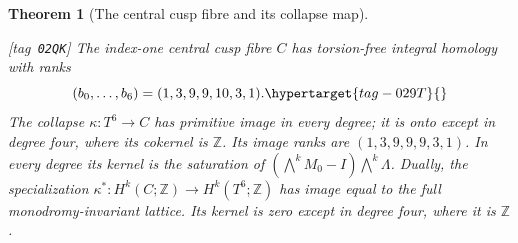 \documentclass[11pt,a4paper]{article}
\numberwithin{equation}{section}
\newtheorem{theorem}{Theorem}[section]
\theoremstyle{definition}
\newcommand{\StatementRecord}[4]{{\upshape\footnotesize[tag~\texttt{#3}]}\enspace\ignorespaces}
\begin{document}
\begin{theorem}[The central cusp fibre and its collapse map]\hypertarget{tag-02QK}{}\label{night:P1.11}\hypertarget{tag-02M6}{}\label{maps:src:E.1.3}
\StatementRecord{night:P1.11}{proved}{02QK}{\cref{night:P1.9}}
The index-one central cusp fibre $C$ has torsion-free integral homology
with ranks
\begin{equation}
 (b_0,\ldots,b_6)=(1,3,9,9,10,3,1).
 \hypertarget{tag-029T}{}\label{maps:eq:E.6}
\end{equation}
The collapse $\kappa:T^6\to C$ has primitive image in every degree;
it is onto except in degree four, where its cokernel is $\mathbb Z$.
Its image ranks are $(1,3,9,9,9,3,1)$.
In every degree its kernel is the saturation of
$(\bigwedge^kM_0-I)\bigwedge^k\Lambda$.
Dually, the specialization
$\kappa^*:H^k(C;\mathbb Z)\to H^k(T^6;\mathbb Z)$
has image equal to the full monodromy-invariant lattice.
Its kernel is zero except in degree four, where it is $\mathbb Z$.
\end{theorem}
\end{document}
